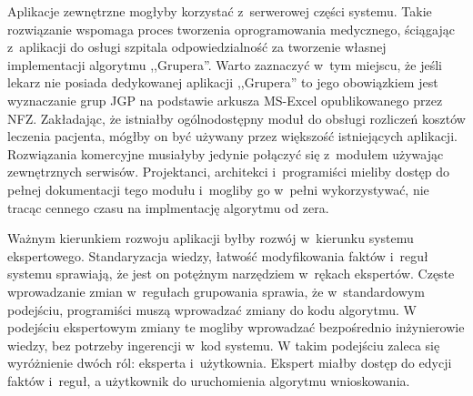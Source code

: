 Aplikacje zewnętrzne mogłyby korzystać z~serwerowej części systemu. Takie rozwiązanie wspomaga proces tworzenia oprogramowania medycznego, ściągając z~aplikacji do osługi szpitala odpowiedzialność za tworzenie własnej implementacji algorytmu ,,Grupera''. Warto zaznaczyć w~tym miejscu, że jeśli lekarz nie posiada dedykowanej aplikacji ,,Grupera'' to jego obowiązkiem jest wyznaczanie grup JGP na podstawie arkusza MS-Excel opublikowanego przez NFZ\cite{plik_parametryzujacy}. 
Zakładając, że istniałby ogólnodostępny moduł do obsługi rozliczeń kosztów leczenia pacjenta, mógłby on być używany przez większość istniejących aplikacji. Rozwiązania komercyjne musiałyby jedynie połączyć się z~modułem używając zewnętrznych serwisów. Projektanci, architekci i~programiści mieliby dostęp do pełnej dokumentacji tego modułu i~mogliby go w~pełni wykorzystywać, nie tracąc cennego czasu na implmentację algorytmu od zera.

Ważnym kierunkiem rozwoju aplikacji byłby rozwój w~kierunku systemu ekspertowego. Standaryzacja wiedzy, łatwość modyfikowania faktów i~reguł systemu sprawiają, że jest on potężnym narzędziem w~rękach ekspertów. Częste wprowadzanie zmian w~regułach grupowania sprawia, że w~standardowym podejściu, programiści muszą wprowadzać zmiany do kodu algorytmu. W podejściu ekspertowym zmiany te mogliby wprowadzać bezpośrednio inżynierowie wiedzy, bez potrzeby ingerencji w~kod systemu.
W takim podejściu zaleca się wyróżnienie dwóch ról: eksperta i~użytkownia. Ekspert miałby dostęp do edycji faktów i~reguł, a użytkownik do uruchomienia algorytmu wnioskowania.

